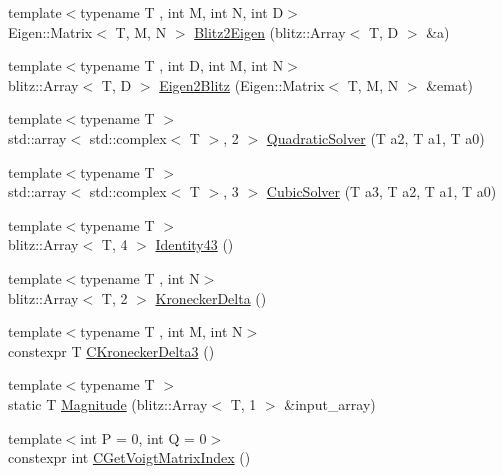 \begin{DoxyCompactItemize}
\item 
{\footnotesize template$<$typename T , int M, int N, int D$>$ }\\Eigen\+::\+Matrix$<$ T, M, N $>$ \mbox{\hyperlink{namespacempc_1_1utilities_afb1a22ab436781cf5a791680bc60988f}{Blitz2\+Eigen}} (blitz\+::\+Array$<$ T, D $>$ \&a)
\item 
{\footnotesize template$<$typename T , int D, int M, int N$>$ }\\blitz\+::\+Array$<$ T, D $>$ \mbox{\hyperlink{namespacempc_1_1utilities_a08e3db41de91c76d936475136d35da9e}{Eigen2\+Blitz}} (Eigen\+::\+Matrix$<$ T, M, N $>$ \&emat)
\item 
{\footnotesize template$<$typename T $>$ }\\std\+::array$<$ std\+::complex$<$ T $>$, 2 $>$ \mbox{\hyperlink{namespacempc_1_1utilities_ad175f8823052a6c863ffb2e90e2b08ca}{Quadratic\+Solver}} (T a2, T a1, T a0)
\item 
{\footnotesize template$<$typename T $>$ }\\std\+::array$<$ std\+::complex$<$ T $>$, 3 $>$ \mbox{\hyperlink{namespacempc_1_1utilities_adbffd8dee20ff121f91cf6be9e19a1b3}{Cubic\+Solver}} (T a3, T a2, T a1, T a0)
\item 
{\footnotesize template$<$typename T $>$ }\\blitz\+::\+Array$<$ T, 4 $>$ \mbox{\hyperlink{namespacempc_1_1utilities_a2a7788e9666343e76796346aa521fb4a}{Identity43}} ()
\item 
{\footnotesize template$<$typename T , int N$>$ }\\blitz\+::\+Array$<$ T, 2 $>$ \mbox{\hyperlink{namespacempc_1_1utilities_aee39ac77e4aad3a854879829eed39b37}{Kronecker\+Delta}} ()
\item 
{\footnotesize template$<$typename T , int M, int N$>$ }\\constexpr T \mbox{\hyperlink{namespacempc_1_1utilities_a15cbef577663b27df8b958056104d5d9}{C\+Kronecker\+Delta3}} ()
\item 
{\footnotesize template$<$typename T $>$ }\\static T \mbox{\hyperlink{namespacempc_1_1utilities_a387fd6b2510b25009905e8121755c207}{Magnitude}} (blitz\+::\+Array$<$ T, 1 $>$ \&input\+\_\+array)
\item 
{\footnotesize template$<$int P = 0, int Q = 0$>$ }\\constexpr int \mbox{\hyperlink{namespacempc_1_1utilities_ad2c3679a8e007d8b5a333490886ef19d}{C\+Get\+Voigt\+Matrix\+Index}} ()

\end{DoxyCompactItemize}
